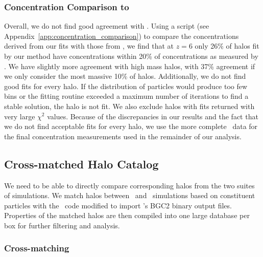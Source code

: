 \subsubsection{Concentration Comparison to \rockstar}
\label{subsubsec:analysis--profile_fitting--rockstar_comparison}


Overall, we do not find good agreement with \rockstar.  Using a script (see Appendix~\ref{app:concentration_comparison}) to compare the concentrations derived from our fits with those from \rockstar, we find that at $z = 6$ only 26\% of halos fit by our method have concentrations within 20\% of concentrations as measured by \rockstar.  We have slightly more agreement with high mass halos, with 37\% agreement if we only consider the most massive 10\% of halos.  Additionally, we do not find good fits for every halo.  If the distribution of particles would produce too few bins or the fitting routine exceeded a maximum number of iterations to find a stable solution, the halo is not fit.  We also exclude halos with fits returned with very large $\chi^{2}$ values.  Because of the discrepancies in our results and the fact that we do not find acceptable fits for every halo, we use the more complete \rockstar\ data for the final concentration measurements used in the remainder of our analysis.




\subsection{Cross-matched Halo Catalog}
\label{subsec:analysis--catalog}


We need to be able to directly compare corresponding halos from the two suites of simulations.  We match halos between \za\ and \lpt\ simulations based on constituent particles with the \crossmatch\ code modified to import \rockstar's BGC2 binary output files.  Properties of the matched halos are then compiled into one large database per box for further filtering and analysis.



\subsubsection{Cross-matching}
\label{subsubsec:analysis--catalog--crossmatching}


